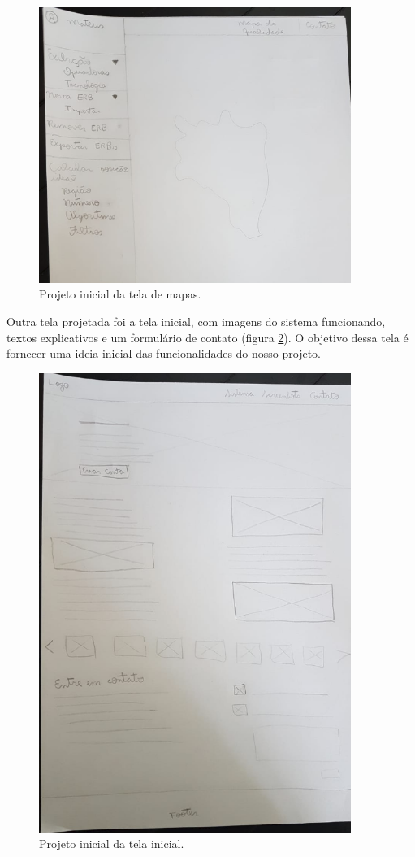 \documentclass[]{politex}
\begin{document}
\begin{figure}[H]
    \centering
    \includegraphics[width=4in]{imagens/rascunho-mapa}
    \caption{Projeto inicial da tela de mapas.}
    \label{fig:rascunho_mapa}
\end{figure}

Outra tela projetada foi a tela inicial, com imagens do sistema funcionando,
textos explicativos e um formulário de contato (figura
\ref{fig:rascunho_landing}). O objetivo dessa tela é fornecer uma ideia inicial
das funcionalidades do nosso projeto.

\begin{figure}[H]
    \centering
    \includegraphics[width=4in]{imagens/rascunho-landing}
    \caption{Projeto inicial da tela inicial.}
    \label{fig:rascunho_landing}
\end{figure}
\end{document}
